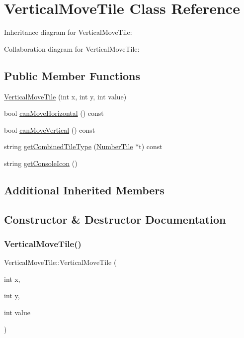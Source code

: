 \hypertarget{classVerticalMoveTile}{}\section{Vertical\+Move\+Tile Class Reference}
\label{classVerticalMoveTile}


Inheritance diagram for Vertical\+Move\+Tile\+:


Collaboration diagram for Vertical\+Move\+Tile\+:
\subsection*{Public Member Functions}
\begin{DoxyCompactItemize}
\item 
\hyperlink{classVerticalMoveTile_aa38dec011e680ebd679cddf96afcf695}{Vertical\+Move\+Tile} (int x, int y, int value)
\item 
bool \hyperlink{classVerticalMoveTile_ae1b1eb1882bb9f0ef5087db7f0e28ff7}{can\+Move\+Horizontal} () const
\item 
bool \hyperlink{classVerticalMoveTile_abbc40894fa875cd906bb348a59ef422e}{can\+Move\+Vertical} () const
\item 
string \hyperlink{classVerticalMoveTile_a8a850a4df774c6132f20806ed531555a}{get\+Combined\+Tile\+Type} (\hyperlink{classNumberTile}{Number\+Tile} $\ast$t) const
\item 
string \hyperlink{classVerticalMoveTile_a0f313f3ba4d1cef0f91f7accd38a93ed}{get\+Console\+Icon} ()
\end{DoxyCompactItemize}
\subsection*{Additional Inherited Members}


\subsection{Constructor \& Destructor Documentation}
\mbox{\label{classVerticalMoveTile_aa38dec011e680ebd679cddf96afcf695}} 
\subsubsection{\texorpdfstring{Vertical\+Move\+Tile()}{VerticalMoveTile()}}
{\footnotesize\ttfamily Vertical\+Move\+Tile\+::\+Vertical\+Move\+Tile (\begin{DoxyParamCaption}\item[{int}]{x,  }\item[{int}]{y,  }\item[{int}]{value }\end{DoxyParamCaption})}

